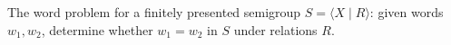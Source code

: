 The word problem for a finitely presented semigroup $S = \langle X \mid R \rangle$: given words $w_1, w_2$, determine whether $w_1 = w_2$ in $S$ under relations $R$.
